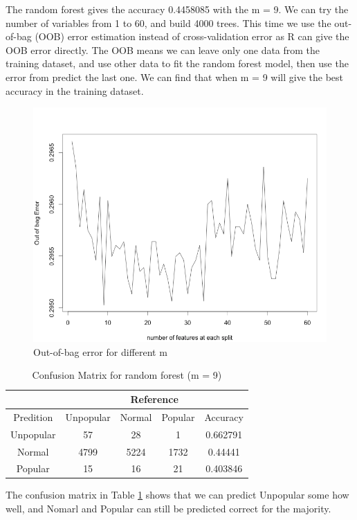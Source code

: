 \documentclass[11pt]{article}
\begin{document}
The random forest gives the accuracy 0.4458085 with the m = 9. We can try the number of variables from 1 to 60, and build 4000 trees. This time we use the out-of-bag (OOB) error estimation instead of cross-validation error as R can give the OOB error directly. The OOB means we can leave only one data from the training dataset, and use other data to fit the random forest model, then use the error from predict the last one. We can find that when m = 9 will give the best accuracy in the training dataset. 

    \begin{figure}[h]
        \centering
        \includegraphics[width=0.7\linewidth]{randomforest_oob.png}
        \caption{Out-of-bag error for different m}
    \end{figure}
    
    \begin{table}[h]
        \centering
        \caption{Confusion Matrix for random forest (m = 9)}
        \begin{tabular}{ c | c | c | c | c }
            \hline\hline
            {} & \multicolumn{4}{c}{Reference} \\
            \hline
            Predition & Unpopular & Normal & Popular & Accuracy\\
            \hline
            Unpopular & 57 & 28 & 1 & 0.662791\\
            \hline
            Normal & 4799 & 5224 & 1732 & 0.44441\\
            \hline
            Popular & 15 & 16 & 21 & 0.403846\\
            \hline\hline
        \end{tabular}
        \label{table:rf}
    \end{table}

The confusion matrix in Table \ref{table:rf} shows that we can predict Unpopular some how well, and Nomarl and Popular can still be predicted correct for the majority.
\end{document}
